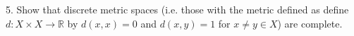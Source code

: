 \documentclass{article}
\theoremstyle{remark} %
\newcommand{\R}{{\mathbb{R}}}
\begin{document}
5. Show that discrete metric spaces (i.e. those with the metric defined as define $d\colon X \times X \to \R$ by $d(x,x) = 0$ and $d(x,y)=1$ for $x\neq y \in X$) are complete. 
\vspace{11cm} %










\end{document}
